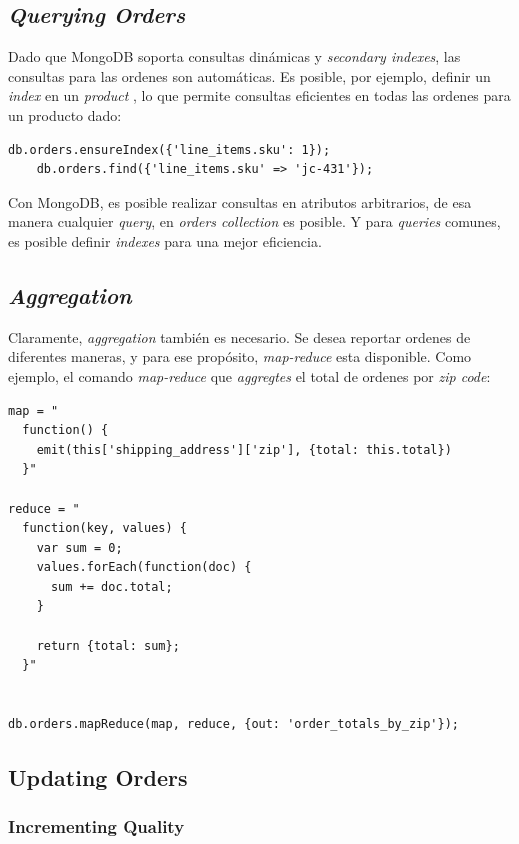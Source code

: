 \subsection{\textit{Querying Orders}}

Dado que MongoDB soporta consultas dinámicas y \textit{secondary indexes}, las consultas para las ordenes son automáticas. Es posible, por ejemplo, definir un \textit{index} en un \textit{product }, lo que permite consultas eficientes en todas las ordenes para un producto dado:

\medskip
\begin{lstlisting}[caption= Consulta eficiente con \textit{secondary indexes}.]
	db.orders.ensureIndex({'line_items.sku': 1});
	db.orders.find({'line_items.sku' => 'jc-431'});
\end{lstlisting}

Con MongoDB, es posible realizar consultas en atributos arbitrarios, de esa manera cualquier \textit{query}, en \textit{orders collection} es posible. Y para \textit{queries} comunes, es posible definir \textit{indexes} para una mejor eficiencia.

\subsection{\textit{Aggregation}}

Claramente, \textit{aggregation} también es necesario. Se desea reportar ordenes de diferentes maneras, y para ese propósito, \textit{map-reduce} esta disponible. Como ejemplo, el comando \textit{map-reduce} que \textit{aggregtes} el total de ordenes por \textit{zip code}:

\begin{lstlisting}[caption= Ejemplo de commando \textit{map-reduce}.]
map = "
  function() {
    emit(this['shipping_address']['zip'], {total: this.total})
  }"

reduce = "
  function(key, values) {
    var sum = 0;
    values.forEach(function(doc) {
      sum += doc.total;
    }

    return {total: sum};
  }"


db.orders.mapReduce(map, reduce, {out: 'order_totals_by_zip'});
\end{lstlisting}

\subsection{Updating Orders}

\subsubsection{Incrementing Quality}

